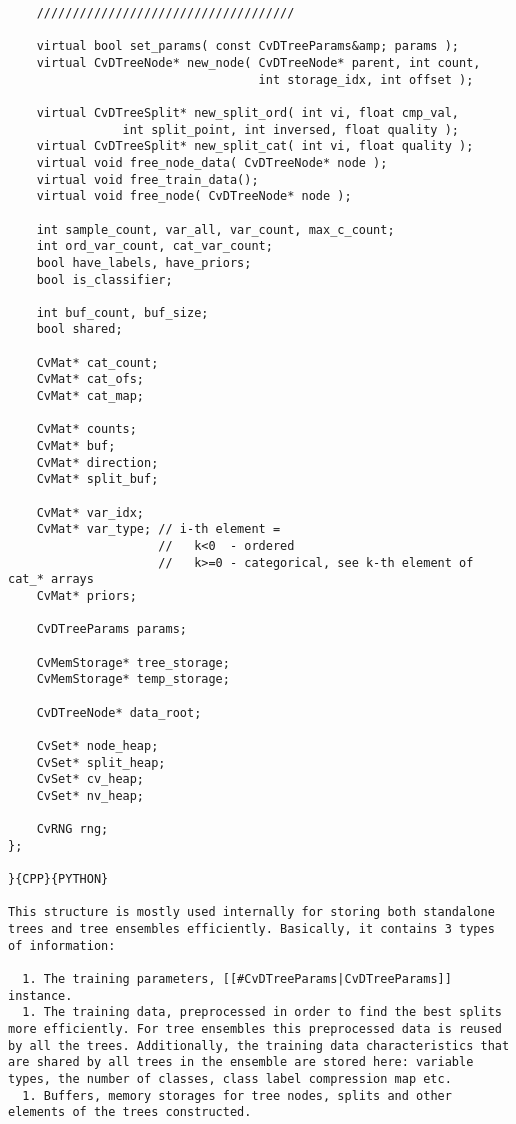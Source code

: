 \begin{verbatim}
    ////////////////////////////////////

    virtual bool set_params( const CvDTreeParams&amp; params );
    virtual CvDTreeNode* new_node( CvDTreeNode* parent, int count,
                                   int storage_idx, int offset );

    virtual CvDTreeSplit* new_split_ord( int vi, float cmp_val,
                int split_point, int inversed, float quality );
    virtual CvDTreeSplit* new_split_cat( int vi, float quality );
    virtual void free_node_data( CvDTreeNode* node );
    virtual void free_train_data();
    virtual void free_node( CvDTreeNode* node );

    int sample_count, var_all, var_count, max_c_count;
    int ord_var_count, cat_var_count;
    bool have_labels, have_priors;
    bool is_classifier;

    int buf_count, buf_size;
    bool shared;

    CvMat* cat_count;
    CvMat* cat_ofs;
    CvMat* cat_map;

    CvMat* counts;
    CvMat* buf;
    CvMat* direction;
    CvMat* split_buf;

    CvMat* var_idx;
    CvMat* var_type; // i-th element =
                     //   k<0  - ordered
                     //   k>=0 - categorical, see k-th element of cat_* arrays
    CvMat* priors;

    CvDTreeParams params;

    CvMemStorage* tree_storage;
    CvMemStorage* temp_storage;

    CvDTreeNode* data_root;

    CvSet* node_heap;
    CvSet* split_heap;
    CvSet* cv_heap;
    CvSet* nv_heap;

    CvRNG rng;
};

}{CPP}{PYTHON}

This structure is mostly used internally for storing both standalone trees and tree ensembles efficiently. Basically, it contains 3 types of information:

  1. The training parameters, [[#CvDTreeParams|CvDTreeParams]] instance.
  1. The training data, preprocessed in order to find the best splits more efficiently. For tree ensembles this preprocessed data is reused by all the trees. Additionally, the training data characteristics that are shared by all trees in the ensemble are stored here: variable types, the number of classes, class label compression map etc.
  1. Buffers, memory storages for tree nodes, splits and other elements of the trees constructed.


\end{verbatim}
